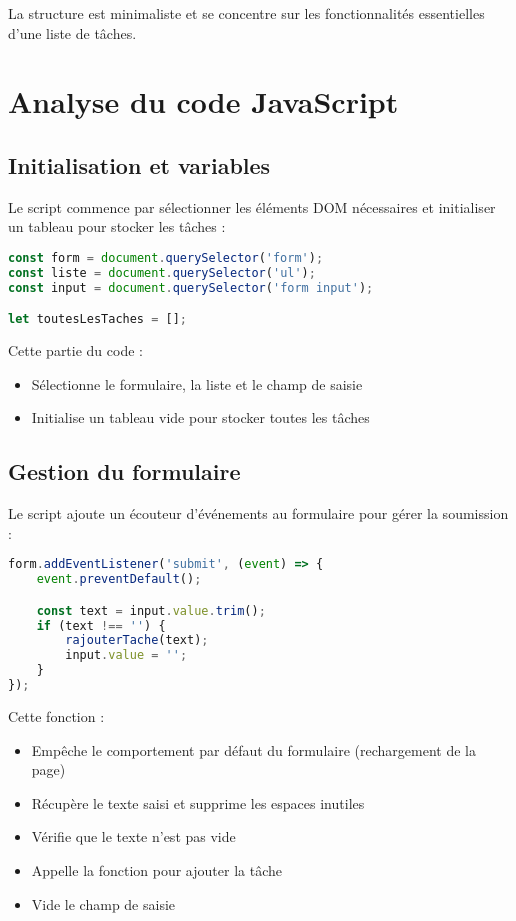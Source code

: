 \documentclass{article}
\begin{document}
La structure est minimaliste et se concentre sur les fonctionnalités essentielles d'une liste de tâches.

\section{Analyse du code JavaScript}

\subsection{Initialisation et variables}
Le script commence par sélectionner les éléments DOM nécessaires et initialiser un tableau pour stocker les tâches :

\begin{lstlisting}[language=JavaScript]
const form = document.querySelector('form');
const liste = document.querySelector('ul');
const input = document.querySelector('form input');

let toutesLesTaches = [];
\end{lstlisting}

Cette partie du code :
\begin{itemize}
    \item Sélectionne le formulaire, la liste et le champ de saisie
    \item Initialise un tableau vide pour stocker toutes les tâches
\end{itemize}

\subsection{Gestion du formulaire}
Le script ajoute un écouteur d'événements au formulaire pour gérer la soumission :

\begin{lstlisting}[language=JavaScript]
form.addEventListener('submit', (event) => {
    event.preventDefault();

    const text = input.value.trim();
    if (text !== '') {
        rajouterTache(text);
        input.value = '';
    }
});
\end{lstlisting}

Cette fonction :
\begin{itemize}
    \item Empêche le comportement par défaut du formulaire (rechargement de la page)
    \item Récupère le texte saisi et supprime les espaces inutiles
    \item Vérifie que le texte n'est pas vide
    \item Appelle la fonction pour ajouter la tâche
    \item Vide le champ de saisie
\end{itemize}
\end{document}
